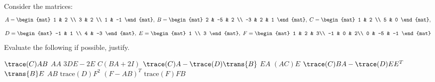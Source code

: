 
\begin{Exercise}[
name={},
title={}, 
difficulty=0,
origin={\cite{YL}}]
Consider the matrices:
\[
A =\begin{mat}
1 & 2 \\
3 & 2 \\
1 & -1
\end{mat},\; B=
\begin{mat}
2 & -5 & 2 \\
-3 & 2 & 1
\end{mat},\; 
C = \begin{mat}
1 & 2 \\
5 & 0
\end{mat},
\]
\[D=
\begin{mat}
-1 & 1 \\
4 & -3
\end{mat},\; E=
\begin{mat}
1 \\
3
\end{mat},\; F=
\begin{mat}
1 & 2 & 3\\
-1 & 0 & 2\\
0 & -5 & -1
\end{mat}
\]
Evaluate the following if possible, justify.
\begin{multicols}{2}
\Question $\trace(C)AB$
\Question $AA$
\Question $3DE-2E$
\Question $C(BA+2I)$
\Question $\trace(C)A-\trace(D)\trans{B}$ 
\Question $EA$
\Question $(AC)E$
\Question $\trace(C)BA - \trace(D)EE^T$
\Question $\trans{B}E$
\Question $AB$
\Question $\text{trace}(D)F^2$
\Question $(F-AB)^T$
\Question $\text{trace}(F)FB$
\EndCurrentQuestion
\end{multicols}
\end{Exercise}

